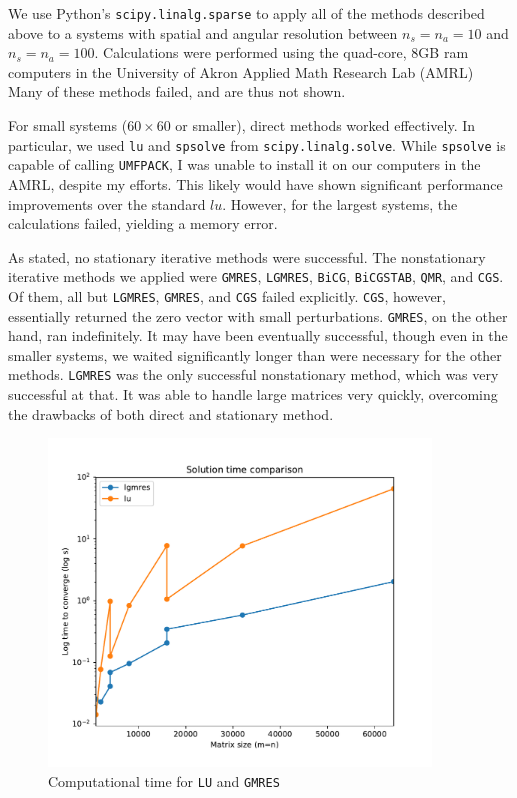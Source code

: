 \documentclass[10pt]{article}
\begin{document}
\begin{multicols}{2}
We use Python's \texttt{scipy.linalg.sparse} to apply all of the methods described above to a systems with spatial and angular resolution between $n_s=n_a=10$ and $n_s=n_a=100$.
Calculations were performed using the quad-core, 8GB ram computers in the University of Akron Applied Math Research Lab (AMRL)
Many of these methods failed, and are thus not shown.

For small systems ($60 \times 60$ or smaller), direct methods worked effectively.
In particular, we used \texttt{lu} and \texttt{spsolve} from \texttt{scipy.linalg.solve}.
While \texttt{spsolve} is capable of calling \texttt{UMFPACK}, I was unable to install it on our computers in the AMRL, despite my efforts.
This likely would have shown significant performance improvements over the standard $lu$.
However, for the largest systems, the calculations failed, yielding a memory error.

As stated, no stationary iterative methods were successful.
The nonstationary iterative methods we applied were \texttt{GMRES}, \texttt{LGMRES}, \texttt{BiCG}, \texttt{BiCGSTAB}, \texttt{QMR}, and \texttt{CGS}.
Of them, all but \texttt{LGMRES}, \texttt{GMRES}, and \texttt{CGS} failed explicitly.
\texttt{CGS}, however, essentially returned the zero vector with small perturbations.
\texttt{GMRES}, on the other hand, ran indefinitely.
It may have been eventually successful, though even in the smaller systems, we waited significantly longer than were necessary for the other methods.
\texttt{LGMRES} was the only successful nonstationary method, which was very successful at that.
It was able to handle large matrices very quickly, overcoming the drawbacks of both direct and stationary method.

\begin{figure}[H]
	\centering
	\includegraphics[width=4in]{img/both_dt_log.pdf}
	\caption{Computational time for \texttt{LU} and \texttt{GMRES}}
	\label{fig:conv_time}
\end{figure}


\end{multicols}
\end{document}
